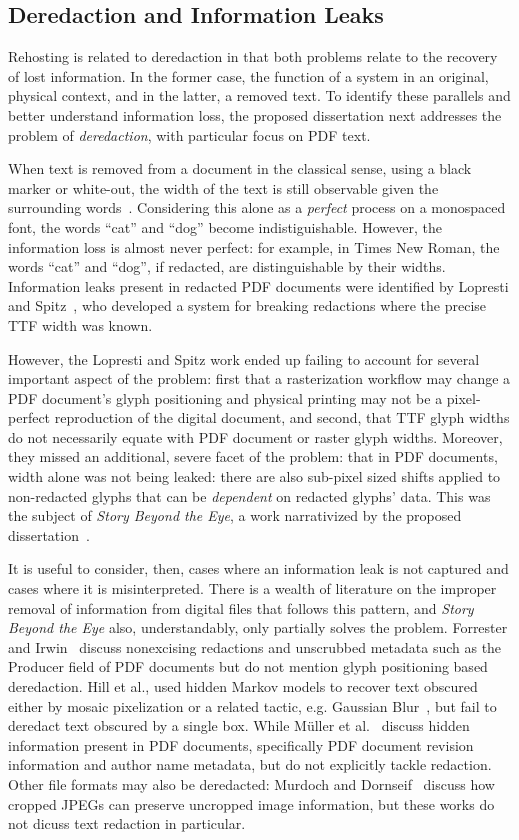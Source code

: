 \subsection{Deredaction and Information Leaks}
Rehosting is related to deredaction in that both problems relate to the recovery of lost information.
In the former case, the function of a system in an original, physical context, and in the latter, a removed text.
To identify these parallels and better understand information loss, the proposed dissertation next addresses the problem of \emph{deredaction}, with particular focus on PDF text.

When text is removed from a document in the classical sense, using a black marker or white-out, the width of the text is still observable given the surrounding words~\cite{egyptian}.
Considering this alone as a \emph{perfect} process on a monospaced font, the words ``cat'' and ``dog'' become indistiguishable.
However, the information loss is almost never perfect: for example, in Times New Roman, the words ``cat'' and ``dog'', if redacted, are distinguishable by their widths.
Information leaks present in redacted PDF documents were identified by Lopresti and Spitz~\cite{lopresti2004quantifying}, who developed a system for breaking redactions where the precise TTF width was known.

However, the Lopresti and Spitz work ended up failing to account for several important aspect of the problem: first that a rasterization workflow may change a PDF document's glyph positioning and physical printing may not be a pixel-perfect reproduction of the digital document, and second, that TTF glyph widths do not necessarily equate with PDF document or raster glyph widths.
Moreover, they missed an additional, severe facet of the problem: that in PDF documents, width alone was not being leaked: there are also sub-pixel sized shifts applied to non-redacted glyphs that can be \emph{dependent} on redacted glyphs' data.
This was the subject of \emph{Story Beyond the Eye}, a work narrativized by the proposed dissertation~\cite{bland2022story}.

It is useful to consider, then, cases where an information leak is not captured and cases where it is misinterpreted.
There is a wealth of literature on the improper removal of information from digital files that follows this pattern, and \emph{Story Beyond the Eye} also, understandably, only partially solves the problem.
Forrester and Irwin~\cite{forrester2005investigation} discuss nonexcising redactions and unscrubbed metadata such as the Producer field of PDF documents but do not mention glyph positioning based deredaction.
Hill et al., used hidden Markov models to recover text obscured either by mosaic pixelization or a related tactic, e.g. Gaussian Blur~\cite{hill2016effectiveness}, but fail to deredact text obscured by a single box.
While M{\"u}ller et al.~\cite{muller2021processing} discuss hidden information present in PDF documents, specifically PDF document revision information and author name metadata, but do not explicitly tackle redaction.
Other file formats may also be deredacted: Murdoch and Dornseif~\cite{murdochmisc} discuss how cropped JPEGs can preserve uncropped image information, but these works do not dicuss text redaction in particular.

